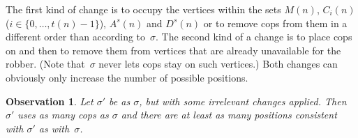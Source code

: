\documentclass[authoryear]{article}
\newtheorem{observation}[theorem]{Observation}
\theoremstyle{definition}
\newcommand{\0}{\emptyset}
\begin{document}
The first kind of change is to occupy the vertices within the sets
$M(n)$, $C_i(n)$ ($i\in\{0,\ldots,t(n)-1\}$), $A^s(n)$ and $D^s(n)$ or
to remove cops from them in
a different order than according to~$\sigma$. The second kind of a change is to
place cops on and then to remove them from vertices that are already
unavailable for the robber. (Note that~$\sigma$ never lets cops stay
on such vertices.) Both changes can obviously only increase the number of
possible positions.

\begin{observation}\label{obs:irrelevant-changes}
Let $\sigma'$ be as $\sigma$, but with some irrelevant changes applied.
Then $\sigma'$ uses as many cops as $\sigma$ and there are at least as
many positions consistent with $\sigma'$ as with~$\sigma$.
\end{observation}
\end{document}
